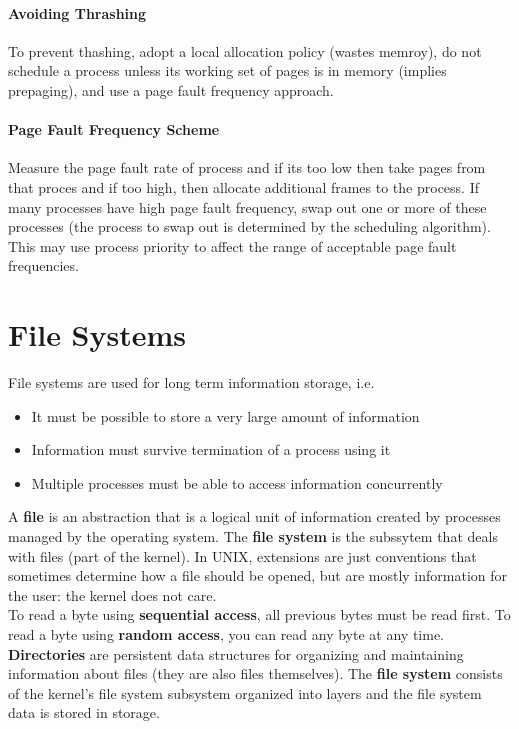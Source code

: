 \documentclass{article}
\newcommand{\bold}[1]{\textbf{#1}}
\renewcommand{\b}{\item[$\circ$]}
\newcommand{\newlist}{\begin{itemize}}
\renewcommand{\endlist}{\end{itemize}}
\begin{document}
\paragraph{Avoiding Thrashing}

To prevent thashing, adopt a local allocation policy (wastes memroy), do not schedule a process unless its working set of pages is in memory (implies prepaging), and use a page fault frequency approach. 

\paragraph{Page Fault Frequency Scheme}

Measure the page fault rate of process and if its too low then take pages from that proces and if too high, then allocate additional frames to the process. If many processes have high page fault frequency, swap out one or more of these processes (the process to swap out is determined by the scheduling algorithm). This may use process priority to affect the range of acceptable page fault frequencies. 

\newpage 
\section{File Systems}

File systems are used for long term information storage, i.e.

\newlist 
\b It must be possible to store a very large amount of information
\b Information must survive termination of a process using it
\b Multiple processes must be able to access information concurrently
\endlist 

A \bold{file} is an abstraction that is a logical unit of information created by processes managed by the operating system. The \bold{file system} is the subssytem that deals with files (part of the kernel). In UNIX, extensions are just conventions that sometimes determine how a file should be opened, but are mostly information for the user: the kernel does not care. \\ 

To read a byte using \bold{sequential access}, all previous bytes must be read first. To read a byte using \bold{random access}, you can read any byte at any time. \\ 

\bold{Directories} are persistent data structures for organizing and maintaining information about files (they are also files themselves). The \bold{file system} consists of the kernel's file system subsystem organized into layers and the file system data is stored in storage. 
\end{document}
